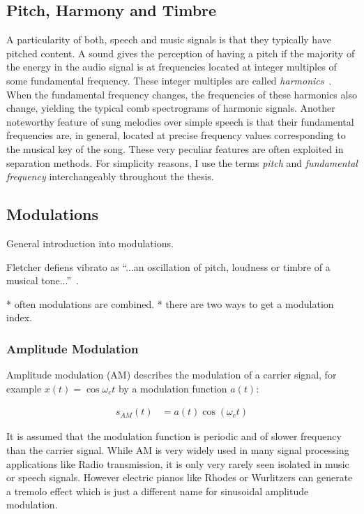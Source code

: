 \subsection{Pitch, Harmony and Timbre}

A particularity of both, speech and music signals is that they typically have pitched content.
A sound gives the perception of having a pitch if the majority of the energy in the audio signal is at frequencies located at integer multiples of some fundamental frequency.
These integer multiples are called \textit{harmonics}~\cite{schenker54}.
When the fundamental frequency changes, the frequencies of these harmonics also change, yielding the typical comb spectrograms of harmonic signals.
Another noteworthy feature of sung melodies over simple speech is that their fundamental frequencies are, in general, located at precise frequency values corresponding to the musical key of the song.
These very peculiar features are often exploited in separation methods.
For simplicity reasons, I use the terms \textit{pitch} and \textit{fundamental frequency} interchangeably throughout the thesis.

\subsection{Modulations}

General introduction into modulations.
\cite{abe98}

Fletcher defiens vibrato as ``...an oscillation of pitch, loudness or timbre of a musical tone...''~\cite{fletcher01}.

* often modulations are combined.
* there are two ways to get a modulation index.

\subsubsection{Amplitude Modulation}

Amplitude modulation (AM) describes the modulation of a carrier signal, for example \(x(t) = \cos \omega_c t\) by a modulation function \(a(t)\):

\begin{align}
    s_{AM}(t) &= a(t) \cos \left( \omega_{c} t\right)
\end{align}

It is assumed that the modulation function is periodic and of slower frequency than the carrier signal.
While AM is very widely used in many signal processing applications like Radio transmission, it is only very rarely seen isolated in music or speech signals.
However electric pianos like Rhodes or Wurlitzers can generate a tremolo effect which is just a different name for sinusoidal amplitude modulation.

